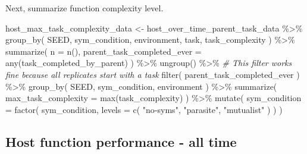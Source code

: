 \documentclass[
]{book}
\newenvironment{Shaded}{\begin{snugshade}}{\end{snugshade}}
\newcommand{\AttributeTok}[1]{\textcolor[rgb]{0.77,0.63,0.00}{#1}}
\newcommand{\CommentTok}[1]{\textcolor[rgb]{0.56,0.35,0.01}{\textit{#1}}}
\newcommand{\FunctionTok}[1]{\textcolor[rgb]{0.00,0.00,0.00}{#1}}
\newcommand{\NormalTok}[1]{#1}
\newcommand{\OtherTok}[1]{\textcolor[rgb]{0.56,0.35,0.01}{#1}}
\newcommand{\SpecialCharTok}[1]{\textcolor[rgb]{0.00,0.00,0.00}{#1}}
\newcommand{\StringTok}[1]{\textcolor[rgb]{0.31,0.60,0.02}{#1}}
\begin{document}
Next, summarize function complexity level.

\begin{Shaded}
\begin{Highlighting}[]
\NormalTok{host\_max\_task\_complexity\_data }\OtherTok{\textless{}{-}}\NormalTok{ host\_over\_time\_parent\_task\_data }\SpecialCharTok{\%\textgreater{}\%}
  \FunctionTok{group\_by}\NormalTok{(}
\NormalTok{    SEED,}
\NormalTok{    sym\_condition,}
\NormalTok{    environment,}
\NormalTok{    task,}
\NormalTok{    task\_complexity}
\NormalTok{  ) }\SpecialCharTok{\%\textgreater{}\%}
  \FunctionTok{summarize}\NormalTok{(}
    \AttributeTok{n =} \FunctionTok{n}\NormalTok{(),}
    \AttributeTok{parent\_task\_completed\_ever =} \FunctionTok{any}\NormalTok{(task\_completed\_by\_parent)}
\NormalTok{  ) }\SpecialCharTok{\%\textgreater{}\%}
  \FunctionTok{ungroup}\NormalTok{() }\SpecialCharTok{\%\textgreater{}\%}
  \CommentTok{\# This filter works fine because all replicates start with a task}
  \FunctionTok{filter}\NormalTok{(}
\NormalTok{    parent\_task\_completed\_ever}
\NormalTok{  ) }\SpecialCharTok{\%\textgreater{}\%}
  \FunctionTok{group\_by}\NormalTok{(}
\NormalTok{    SEED,}
\NormalTok{    sym\_condition,}
\NormalTok{    environment}
\NormalTok{  ) }\SpecialCharTok{\%\textgreater{}\%}
  \FunctionTok{summarize}\NormalTok{(}
    \AttributeTok{max\_task\_complexity =} \FunctionTok{max}\NormalTok{(task\_complexity)}
\NormalTok{  ) }\SpecialCharTok{\%\textgreater{}\%}
  \FunctionTok{mutate}\NormalTok{(}
    \AttributeTok{sym\_condition =} \FunctionTok{factor}\NormalTok{(}
\NormalTok{      sym\_condition,}
      \AttributeTok{levels =} \FunctionTok{c}\NormalTok{(}
        \StringTok{"no{-}syms"}\NormalTok{,}
        \StringTok{"parasite"}\NormalTok{,}
        \StringTok{"mutualist"}
\NormalTok{      )}
\NormalTok{    )}
\NormalTok{  )}
\end{Highlighting}
\end{Shaded}

\hypertarget{host-function-performance---all-time-2}{%
\subsection{Host function performance - all time}\label{host-function-performance---all-time-2}}
\end{document}
